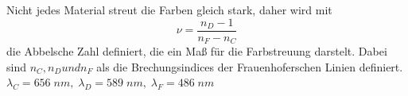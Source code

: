 Nicht jedes Material streut die Farben gleich stark, daher wird mit
\begin{equation}
  \nu=\frac{n_D -1}{n_F-n_C}
  \label{eqn:abbel}
\end{equation}
die Abbelsche Zahl definiert, die ein Maß für die Farbstreuung darstelt.
Dabei sind $n_C, n_D und n_F$ als die Brechungsindices der Frauenhoferschen
Linien definiert.
$\lambda_C=656\;nm,\;\lambda_D=589\;nm,\;\lambda_F=486\;nm$
